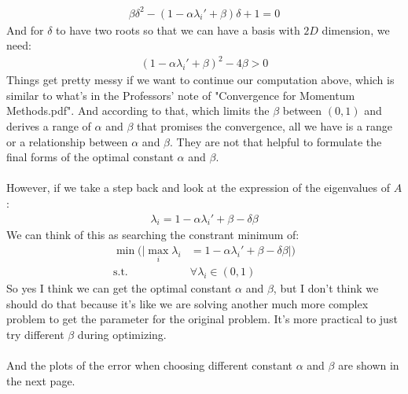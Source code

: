 \documentclass[11pt,letterpaper]{article}
\begin{document}
\begin{tcolorbox}
\begin{enumerate}[\quad\quad]
\begin{align*}
            \beta \delta^2 -(1-\alpha \lambda_i' + \beta)\delta + 1 = 0
        \end{align*}
        And for $\delta$ to have two roots so that we can have a basis with $2D$ dimension, we need:
        \begin{align*}
            (1-\alpha \lambda_i' + \beta)^2 - 4\beta > 0
        \end{align*}
        Things get pretty messy if we want to continue our computation above, which is similar to what's in the Professors' note of "Convergence for Momentum Methods.pdf". And according to that, which limits the $\beta$ between $(0,1)$ and derives a range of $\alpha$ and $\beta$ that promises the convergence, all we have is a range or a relationship between $\alpha$ and $\beta$. They are not that helpful to formulate the final forms of the optimal constant $\alpha$ and $\beta$. 
        \\\\
        However, if we take a step back and look at the expression of the eigenvalues of $A$:
        \begin{align*}
            \lambda_i = 1 - \alpha \lambda_i' + \beta - \delta \beta
        \end{align*}
        We can think of this as searching the constrant minimum of:
        \begin{align*}
            \min(|\max_{i} \lambda_i &= 1 - \alpha \lambda_i' + \beta - \delta \beta|) \\
            \text{s.t. } &\forall \lambda_i \in (0,1)
        \end{align*}
        So yes I think we can get the optimal constant $\alpha$ and $\beta$, but I don't think we should do that because it's like we are solving another much more complex problem to get the parameter for the original problem. It's more practical to just try different $\beta$ during optimizing.
        \\\\
        And the plots of the error when choosing different constant $\alpha$ and $\beta$ are shown in the next page.
    \end{enumerate}
\end{tcolorbox}

\newpage
\end{document}
